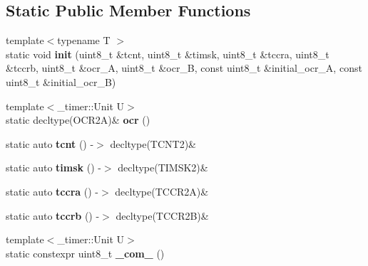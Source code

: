 \subsection*{Static Public Member Functions}
\begin{DoxyCompactItemize}
\item 
{\footnotesize template$<$typename T $>$ }\\static void {\bfseries init} (uint8\+\_\+t \&tcnt, uint8\+\_\+t \&timsk, uint8\+\_\+t \&tccra, uint8\+\_\+t \&tccrb, uint8\+\_\+t \&ocr\+\_\+A, uint8\+\_\+t \&ocr\+\_\+B, const uint8\+\_\+t \&initial\+\_\+ocr\+\_\+A, const uint8\+\_\+t \&initial\+\_\+ocr\+\_\+B)\hypertarget{struct__timer2_1_1TimerDef_ae62a0aed34d1f08b3762198423643d5d}{}\label{struct__timer2_1_1TimerDef_ae62a0aed34d1f08b3762198423643d5d}

\item 
{\footnotesize template$<$\+\_\+timer\+::\+Unit U$>$ }\\static decltype(O\+C\+R2A)\& {\bfseries ocr} ()\hypertarget{struct__timer2_1_1TimerDef_a523743f5df50cbf31d78788a540523c8}{}\label{struct__timer2_1_1TimerDef_a523743f5df50cbf31d78788a540523c8}

\item 
static auto {\bfseries tcnt} () -\/$>$ decltype(T\+C\+N\+T2)\&\hypertarget{struct__timer2_1_1TimerDef_a77ffa6627938529350f5d566511f3e9a}{}\label{struct__timer2_1_1TimerDef_a77ffa6627938529350f5d566511f3e9a}

\item 
static auto {\bfseries timsk} () -\/$>$ decltype(T\+I\+M\+S\+K2)\&\hypertarget{struct__timer2_1_1TimerDef_a7112e5b8029941e7bef449e1961031f9}{}\label{struct__timer2_1_1TimerDef_a7112e5b8029941e7bef449e1961031f9}

\item 
static auto {\bfseries tccra} () -\/$>$ decltype(T\+C\+C\+R2A)\&\hypertarget{struct__timer2_1_1TimerDef_a3e39ad00e0e112a8280ae59df1d14e8f}{}\label{struct__timer2_1_1TimerDef_a3e39ad00e0e112a8280ae59df1d14e8f}

\item 
static auto {\bfseries tccrb} () -\/$>$ decltype(T\+C\+C\+R2B)\&\hypertarget{struct__timer2_1_1TimerDef_a9239a84a67f6c09ef673735a2b0dbb73}{}\label{struct__timer2_1_1TimerDef_a9239a84a67f6c09ef673735a2b0dbb73}

\item 
{\footnotesize template$<$\+\_\+timer\+::\+Unit U$>$ }\\static constexpr uint8\+\_\+t {\bfseries \+\_\+com\+\_} ()\hypertarget{struct__timer2_1_1TimerDef_a051f747118eef23a55327e261380d707}{}\label{struct__timer2_1_1TimerDef_a051f747118eef23a55327e261380d707}


\end{DoxyCompactItemize}
